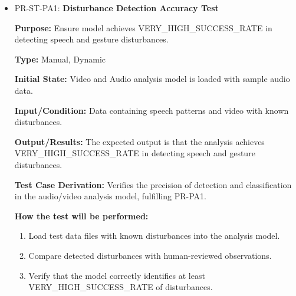 \documentclass[12pt, titlepage]{article}
\begin{document}
\begin{itemize}
  \item PR-ST-PA1: \textbf{Disturbance Detection Accuracy Test}
    \begin{mdframed}[linewidth=0.5mm]
      \textbf{Purpose:} Ensure model achieves VERY\_HIGH\_SUCCESS\_RATE in detecting speech and gesture disturbances. \par
      \textbf{Type:} Manual, Dynamic \par
      \textbf{Initial State:} Video and Audio analysis model is loaded with sample audio data. \par
      \textbf{Input/Condition:} Data containing speech patterns and video with known \\ disturbances. \par
      \textbf{Output/Results:} The expected output is that the analysis achieves \\ VERY\_HIGH\_SUCCESS\_RATE in detecting speech and gesture disturbances. \par
      \textbf{Test Case Derivation:} Verifies the precision of detection and classification in the audio/video analysis model, fulfilling PR-PA1. \par
      \textbf{How the test will be performed:}
      \begin{enumerate}[noitemsep]
        \item Load test data files with known disturbances into the analysis model.
        \item Compare detected disturbances with human-reviewed observations.
        \item Verify that the model correctly identifies at least \\ VERY\_HIGH\_SUCCESS\_RATE of disturbances.
      \end{enumerate}
  \end{mdframed}


\end{itemize}
\end{document}
